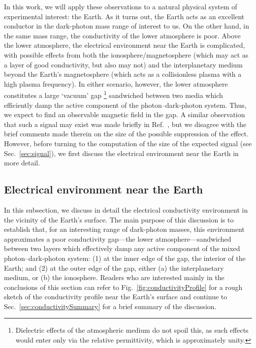\documentclass[amsmath,amssymb,aps,10pt,prd,letterpaper,nofootinbib,balancelastpage,notitlepage,superscriptaddress,twocolumn,floatfix]{revtex4-2}
\newcommand{\figref}[2][]{Fig{#1}.~\ref{#2}}		%
\newcommand{\secref}[2][]{Sec{#1}.~\ref{#2}}		%
\newcommand{\citeR}[2][]{Ref{#1}.~\cite{#2}}		%
\begin{document}
In this work, we will apply these observations to a natural physical system of experimental interest: the Earth.
As it turns out, the Earth acts as an excellent conductor in the dark-photon mass range of interest to us.
On the other hand, in the same mass range, the conductivity of the lower atmosphere is poor. 
Above the lower atmosphere, the electrical environment near the Earth is complicated, with possible effects from both the ionosphere/magnetosphere (which may act as a layer of good conductivity, but also may not) and the interplanetary medium beyond the Earth's magnetosphere (which acts as a collisionless plasma with a high plasma frequency).
In either scenario, however, the lower atmosphere constitutes a large `vacuum' gap%
\footnote{\label{ftnt:dielectricEffectsOK}%
    Dielectric effects of the atmospheric medium do not spoil this, as such effects would enter only via the relative permittivity, which is approximately unity.
} %
sandwiched between two media which efficiently damp the active component of the photon--dark-photon system.
Thus, we expect to find an observable magnetic field in the gap. 
A similar observation that such a signal may exist was made briefly in \citeR{Dubovsky:2015cca}, but we disagree with the brief comments made therein on the size of the possible suppression of the effect.
However, before turning to the computation of the size of the expected signal (see \secref{sec:signal}), we first discuss the electrical environment near the Earth in more detail.


\subsection{Electrical environment near the Earth}
\label{sec:conductivityNearEarth}

In this subsection, we discuss in detail the electrical conductivity environment in the vicinity of the Earth's surface. 
The main purpose of this discussion is to establish that, for an interesting range of dark-photon masses, this environment approximates a poor conductivity gap---the lower atmosphere---sandwiched between two layers which effectively damp any active component of the mixed photon--dark-photon system: (1) at the inner edge of the gap, the interior of the Earth; and (2) at the outer edge of the gap, either (a) the interplanetary medium, or (b) the ionosphere.
Readers who are interested mainly in the conclusions of this section can refer to \figref{fig:conductivityProfile} for a rough sketch of the conductivity profile near the Earth's surface and continue to \secref{sec:conductivitySummary} for a brief summary of the discussion.
\end{document}
